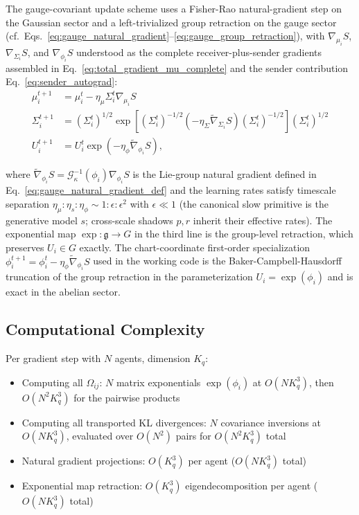 \documentclass[11pt]{article}
\begin{document}
The gauge-covariant update scheme uses a Fisher-Rao natural-gradient step on the Gaussian sector and a left-trivialized group retraction on the gauge sector (cf.\ Eqs.~\ref{eq:gauge_natural_gradient}--\ref{eq:gauge_group_retraction}), with $\nabla_{\mu_i} S$, $\nabla_{\Sigma_i} S$, and $\nabla_{\phi_i} S$ understood as the complete receiver-plus-sender gradients assembled in Eq.~\eqref{eq:total_gradient_mu_complete} and the sender contribution Eq.~\eqref{eq:sender_autograd}:
\begin{align}
\mu_i^{t+1} &= \mu_i^t - \eta_\mu \Sigma_i^t \nabla_{\mu_i} S \\
\Sigma_i^{t+1} &= \left(\Sigma_i^t\right)^{1/2} \exp\left[\left(\Sigma_i^t\right)^{-1/2}\left(-\eta_\Sigma \tilde{\nabla}_{\Sigma_i} S\right)\left(\Sigma_i^t\right)^{-1/2}\right] \left(\Sigma_i^t\right)^{1/2} \\
U_i^{t+1} &= U_i^t \exp\left(-\eta_\phi \tilde{\nabla}_{\phi_i} S\right),
\end{align}

where $\tilde{\nabla}_{\phi_i} S = \mathcal{G}_\kappa^{-1}(\phi_i)\nabla_{\phi_i} S$ is the Lie-group natural gradient defined in Eq.~\ref{eq:gauge_natural_gradient_def} and the learning rates satisfy timescale separation $\eta_\mu : \eta_s : \eta_\phi \sim 1 : \epsilon : \epsilon^2$ with $\epsilon \ll 1$ (the canonical slow primitive is the generative model $s$; cross-scale shadows $p, r$ inherit their effective rates). The exponential map $\exp : \mathfrak{g} \to G$ in the third line is the group-level retraction, which preserves $U_i \in G$ exactly. The chart-coordinate first-order specialization $\phi_i^{t+1} = \phi_i^t - \eta_\phi \tilde{\nabla}_{\phi_i} S$ used in the working code is the Baker-Campbell-Hausdorff truncation of the group retraction in the parameterization $U_i = \exp(\phi_i)$ and is exact in the abelian sector.

\subsection*{Computational Complexity}

Per gradient step with $N$ agents, dimension $K_q$:
\begin{itemize}
\item Computing all $\Omega_{ij}$: $N$ matrix exponentials $\exp(\phi_i)$ at $O(N K_q^3)$, then $O(N^2 K_q^3)$ for the pairwise products
\item Computing all transported KL divergences: $N$ covariance inversions at $O(N K_q^3)$, evaluated over $O(N^2)$ pairs for $O(N^2 K_q^3)$ total
\item Natural gradient projections: $O(K_q^3)$ per agent ($O(N K_q^3)$ total)
\item Exponential map retraction: $O(K_q^3)$ eigendecomposition per agent ($O(N K_q^3)$ total)
\end{itemize}
\end{document}

